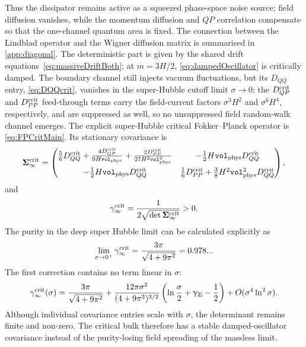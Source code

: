\documentclass{article}
\newcommand{\Vphys}{\mathtt{vol}_{\rm phys}}
\numberwithin{equation}{section}
\begin{document}
	Thus the dissipator remains active as a squeezed phase-space noise source; field diffusion vanishes, while the momentum diffusion and \(QP\) correlation compensate so that the one-channel quantum area is fixed. The connection between the Lindblad operator and the Wigner diffusion matrix is summarised in \cref{app:diagonal}. The deterministic part is given by the shared drift equations~\eqref{eq:massiveDriftBoth}; at \(m=3H/2\), \cref{eq:dampedOscillator} is critically damped. The boundary channel still injects vacuum fluctuations, but its \(D_{QQ}\) entry, \cref{eq:DQQcrit}, vanishes in the super-Hubble cutoff limit $\sigma\to 0$; the \(D_{QP}^{\rm crit}\) and \(D_{PP}^{\rm crit}\) feed-through terms carry the field-current factors \(\sigma^3H^2\) and \(\sigma^6H^4\), respectively, and are suppressed as well, so no unsuppressed field random-walk channel emerges. The explicit super-Hubble critical Fokker--Planck operator is \cref{eq:FPCritMain}. Its stationary covariance is
	\begin{equation}
		\mathbf{\Sigma}_\infty^{\rm crit}
		=
		\begin{pmatrix}
			\frac56D_{QQ}^{\rm crit}
			+\frac{4D_{QP}^{\rm crit}}{9H\Vphys}
			+\frac{2D_{PP}^{\rm crit}}{27H^2\Vphys^2}
			&
			-\frac12H\Vphys D_{QQ}^{\rm crit}
			\\[8pt]
			-\frac12H\Vphys D_{QQ}^{\rm crit}
			&
			\frac16D_{PP}^{\rm crit}
			+\frac38H^2\Vphys^2D_{QQ}^{\rm crit}
		\end{pmatrix},
		\label{eq:CriticalStationaryCovMain}
	\end{equation}
	and
	\begin{equation}
		\gamma_\infty^{\rm crit}
		=
		\frac{1}{2\sqrt{\det\mathbf{\Sigma}_\infty^{\rm crit}}}>0 .
		\label{eq:CriticalPurityMain}
	\end{equation}
	The purity in the deep super Hubble limit can be calculated explicitly as
	\begin{equation}
		\lim_{\sigma\to0^+}\gamma_\infty^{\rm crit}
		=
		\frac{3\pi}{\sqrt{4+9\pi^2}} = 0.978...
		\label{eq:CriticalPurityLimitMain}
	\end{equation}
	The first correction contains no term linear in \(\sigma\):
	\begin{equation}
		\gamma_\infty^{\rm crit}(\sigma)
		=
		\frac{3\pi}{\sqrt{4+9\pi^2}}
		+
		\frac{12\pi\sigma^2}{(4+9\pi^2)^{3/2}}
		\left(
		\ln\frac{\sigma}{2}
		+\upgamma_{\rm E}
		-\frac12
		\right)
		+O(\sigma^4\ln^2\sigma).
		\label{eq:CriticalPurityFirstCorrectionMain}
	\end{equation}
	Although individual covariance entries scale with \(\sigma\), the determinant remains finite and non-zero. The critical bulk therefore has a stable damped-oscillator covariance instead of the purity-losing field spreading of the massless limit.
\end{document}

